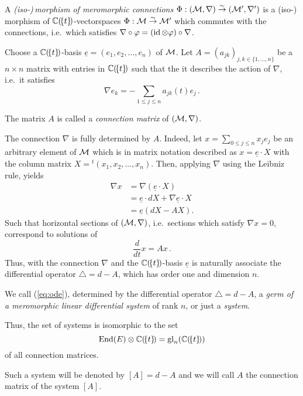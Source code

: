 \begin{defn}
  A \emph{(iso-)\,morphism of meromorphic connections}
  $\Phi:(\mathcal{M},\nabla)\overset{\sim}\to(\mathcal{M}',\nabla')$ is a (iso-)\,morphism of
  $\mathbb{C}(\!\{t\}\!)$-vectorspaces $\Phi:\mathcal{M}\overset{\sim}\to\mathcal{M}'$ which commutes
  with the connections, i.e.\ which satisfies
  $\nabla\circ\varphi = (\operatorname{id}\otimes\varphi)\circ\nabla$.
\end{defn}
Choose a $\mathbb{C}(\!\{t\}\!)$-basis $\underline{e}=(e_1,e_2,\dots,e_n)$ of $\mathcal{M}$.
Let $A=(a_{jk})_{j,k\in\{1,\dots,n\}}$ be a $n\times n$ matrix with entries in
$\mathbb{C}(\!\{t\}\!)$ such that the it describes the action of $\nabla$, i.e.\ it
satisfies
\[
  \nabla e_k
  =
  -\sum_{1\leq j\leq n} a_{jk}(t)e_j \,.
\]
\begin{defn}
  The matrix $A$ is called a \emph{connection matrix} of $(\mathcal{M},\nabla)$.
\end{defn}
The connection $\nabla$ is fully determined by $A$. Indeed, let
$x=\sum_{0\leq j\leq n}x_je_j$ be an arbitrary element of $\mathcal{M}$ which is in
matrix notation described as $x=\underline{e}\cdot X$ with the column matrix
$X={}^t\!(x_1,x_2 ,\dots,x_n)$.
Then, applying $\nabla$ using the Leibniz rule, yields
\begin{align*}
  \nabla x&=\nabla\left(\underline{e}\cdot X\right)
  \\&=\underline{e} \cdot dX + \nabla \underline{e} \cdot X
  \\&=\underline{e}\left(dX-AX\right).
\end{align*}
Such that horizontal sections of $(\mathcal{M},\nabla)$, i.e.\ sections which satisfy
$\nabla x=0$, correspond to solutions of
\begin{equation}\label{eq:ode}
  \frac{d}{dt}x=Ax \,.
\end{equation}
Thus, with the connection $\nabla$ and the $\mathbb{C}(\!\{t\}\!)$-basis
$\underline{e}$ is naturally associate the differential operator
$\triangle=d-A$, which has order one and dimension $n$.
\begin{defn}
  We call (\ref{eq:ode}), determined by the differential operator
  $\triangle=d-A$, a \emph{germ of a meromorphic linear differential system} of
  rank $n$, or just a \emph{system}.
  \begin{s-prop}
    Thus, the set of systems is isomorphic to the set
    \[
      \operatorname{End}(E)\otimes\mathbb{C}(\!\{t\}\!)=\operatorname{gl}_n(\mathbb{C}(\!\{t\}\!))
    \]
    of all connection matrices.
  \end{s-prop}
  Such a system will be denoted by $[A]=d-A$ and we will call $A$ the
  connection matrix of the system $[A]$.
\end{defn}

